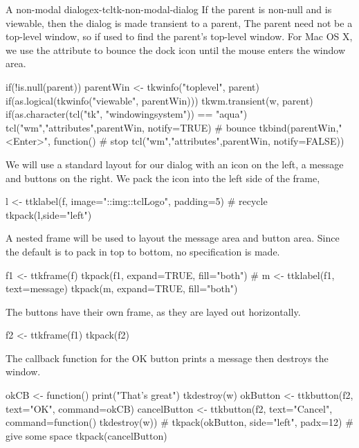 \begin{example}{A non-modal dialog}{ex-tcltk-non-modal-dialog}
If the parent is non-null and is viewable, then the dialog is made
transient to a parent, The parent need not be a top-level window, so
 if used to find the parent's top-level window. For
Mac OS X, we use the  attribute to bounce the dock icon
until the mouse enters the window area.

\begin{Schunk}
\begin{Sinput}
 if(!is.null(parent)) {
   parentWin <- tkwinfo("toplevel", parent)
   if(as.logical(tkwinfo("viewable", parentWin))) {
     tkwm.transient(w, parent)
     if(as.character(tcl("tk", "windowingsystem")) == "aqua") {
       tcl("wm","attributes",parentWin, notify=TRUE) # bounce
       tkbind(parentWin,"<Enter>", function()        # stop
              tcl("wm","attributes",parentWin, notify=FALSE)) 
     }
   }
 }
\end{Sinput}
\end{Schunk}

We will use a standard layout for our dialog with an icon on the left,
a message and buttons on the right. We pack the icon into the left side of the frame,
\begin{Schunk}
\begin{Sinput}
 l <- ttklabel(f, image="::img::tclLogo", padding=5) # recycle
 tkpack(l,side="left")
\end{Sinput}
\end{Schunk}

A nested frame will be used to layout the message area and button area. Since the  default is to pack in top to bottom, no  specification is made.
\begin{Schunk}
\begin{Sinput}
 f1 <- ttkframe(f)
 tkpack(f1, expand=TRUE, fill="both")
 #
 m <- ttklabel(f1, text=message)
 tkpack(m, expand=TRUE, fill="both")
\end{Sinput}
\end{Schunk}

The buttons have their own frame, as they are layed out horizontally. 
\begin{Schunk}
\begin{Sinput}
 f2 <- ttkframe(f1)
 tkpack(f2)
\end{Sinput}
\end{Schunk}
%
The callback function for the OK button prints a message then destroys the window.
\begin{Schunk}
\begin{Sinput}
 okCB <- function() {
   print("That's great")
   tkdestroy(w)
 }
 okButton <- ttkbutton(f2, text="OK", command=okCB)
 cancelButton <- ttkbutton(f2, text="Cancel", 
                           command=function() tkdestroy(w))
 #
 tkpack(okButton, side="left", padx=12)  # give some space
 tkpack(cancelButton)
\end{Sinput}
\end{Schunk}
%


\end{example}
